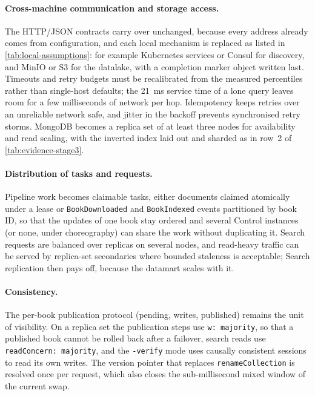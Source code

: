 \documentclass[10pt,a4paper]{article}
\newcommand{\code}[1]{\texttt{#1}}
\begin{document}
\paragraph{Cross-machine communication and storage access.}
The HTTP/JSON contracts carry over unchanged, because every address already
comes from configuration, and each local mechanism is replaced as listed in
\cref{tab:local-assumptions}: for example Kubernetes services or Consul for
discovery, and MinIO or S3 for the datalake, with a completion marker object
written last. Timeouts and retry budgets must be recalibrated from the measured
percentiles rather than single-host defaults; the 21~ms service time of a lone
query leaves room for a few milliseconds of network per hop. Idempotency keeps
retries over an unreliable network safe, and jitter in the backoff prevents
synchronised retry storms. MongoDB becomes a replica set of at least three
nodes for availability and read scaling, with the inverted index laid out and
sharded as in row~2 of \cref{tab:evidence-stage3}.

\paragraph{Distribution of tasks and requests.}
Pipeline work becomes claimable tasks, either documents claimed atomically
under a lease or \code{BookDownloaded} and \code{BookIndexed} events
partitioned by book ID, so that the updates of one book stay ordered and
several Control instances (or none, under choreography) can share the work
without duplicating it. Search requests are balanced over replicas on several
nodes, and read-heavy traffic can be served by replica-set secondaries where
bounded staleness is acceptable; Search replication then pays off, because the
datamart scales with it.

\paragraph{Consistency.}
The per-book publication protocol (pending, writes, published) remains the
unit of visibility. On a replica set the publication steps use
\code{w: majority}, so that a published book cannot be rolled back after a
failover, search reads use \code{readConcern: majority}, and the \code{-verify}
mode uses causally consistent sessions to read its own writes. The version
pointer that replaces \code{renameCollection} is resolved once per request,
which also closes the sub-millisecond mixed window of the current swap.
\end{document}
